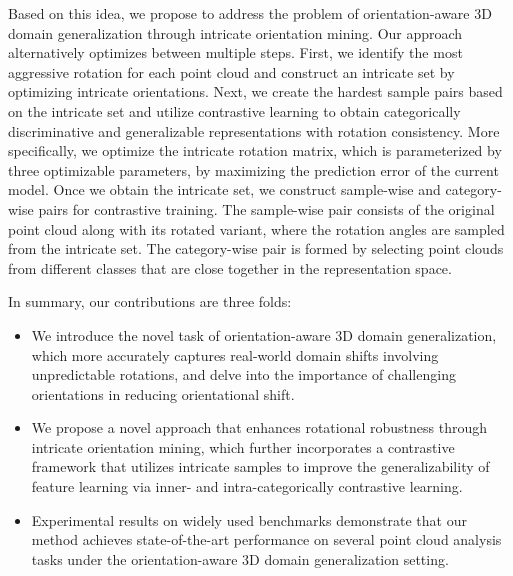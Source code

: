Based on this idea, we propose to address the problem of orientation-aware 3D domain generalization through intricate orientation mining. Our approach alternatively optimizes between multiple steps. First, we identify the most aggressive rotation for each point cloud and construct an intricate set by optimizing intricate orientations. Next, we create the hardest sample pairs based on the intricate set and utilize contrastive learning to obtain categorically discriminative and generalizable representations with rotation consistency.
More specifically, we optimize the intricate rotation matrix, which is parameterized by three optimizable parameters, by maximizing the prediction error of the current model. Once we obtain the intricate set, we construct sample-wise and category-wise pairs for contrastive training. The sample-wise pair consists of the original point cloud along with its rotated variant, where the rotation angles are sampled from the intricate set. The category-wise pair is formed by selecting point clouds from different classes that are close together in the representation space.


In summary, our contributions are three folds:
\begin{itemize}
\item We introduce the novel task of orientation-aware 3D domain generalization, which more accurately captures real-world domain shifts involving unpredictable rotations, and delve into the importance of challenging orientations in reducing orientational shift.
\item We propose a novel approach that enhances rotational robustness through intricate orientation mining, which further incorporates a contrastive framework that utilizes intricate samples to improve the generalizability of feature learning via inner- and intra-categorically contrastive learning.
\item Experimental results on widely used benchmarks demonstrate that our method achieves state-of-the-art performance on several point cloud analysis tasks under the orientation-aware 3D domain generalization setting.
\end{itemize}

